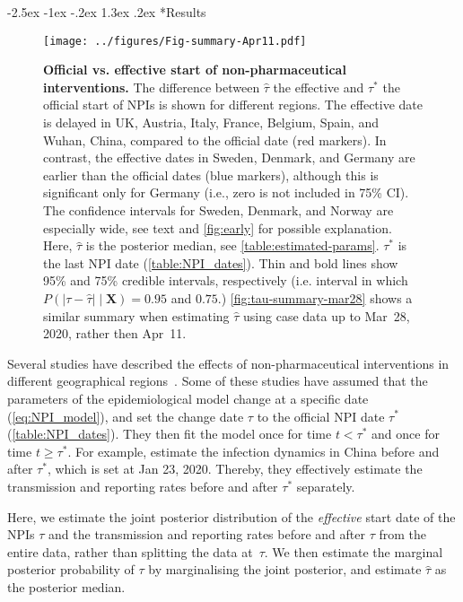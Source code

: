 \documentclass[12pt]{extarticle}
\makeatletter
\renewcommand\section{\@startsection {section}{1}{\z@}%
     {-2.5ex \@plus -1ex \@minus -.2ex}%
     {1.3ex \@plus.2ex}%
    {\Large\bfseries}}
\let\vec\mathbf
\makeatother
\begin{document}
\section*{Results}



\begin{figure}[b!]
    \centering
	\texttt{[image: ../figures/Fig-summary-Apr11.pdf]}	
    \caption{
    \textbf{Official vs. effective start of non-pharmaceutical interventions.}
    	The difference between $\hat{\tau}$ the effective and $\tau^*$ the official start of NPIs is shown for different regions. The effective date is delayed in UK, Austria, Italy, France, Belgium, Spain, and Wuhan, China, compared to the official date (red markers). In contrast, the effective dates in Sweden, Denmark, and Germany are earlier than the official dates (blue markers), although this is significant only for Germany (i.e., zero is not included in 75\% CI). The confidence intervals for Sweden, Denmark, and Norway are especially wide, see text and \autoref{fig:early} for possible explanation.
	Here, $\hat{\tau}$ is the posterior median, see \autoref{table:estimated-params}. $\tau^*$ is the last NPI date (\autoref{table:NPI_dates}). Thin and bold lines show 95\% and 75\% credible intervals, respectively (i.e. interval in which $P(|\tau - \hat{\tau}| \mid \vec{X}) = 0.95$ and $0.75$.) \autoref{fig:tau-summary-mar28} shows a similar summary when estimating $\hat{\tau}$ using case data up to Mar~28, 2020, rather then Apr~11.
    }
    \label{fig:tau-summary}
\end{figure}



Several studies have described the effects of non-pharmaceutical interventions in different geographical regions~\citep{Flaxman2020,Gatto2020,Li2020}. 
Some of these studies have assumed that the parameters of the epidemiological model change at a specific date (\autoref{eq:NPI_model}), and set the change date $\tau$ to the official NPI date $\tau^*$ (\autoref{table:NPI_dates}).
They then fit the model once for time $t<\tau^*$ and once for time $t \ge \tau^*$.
For example, \citet{Li2020} estimate the infection dynamics in China before and after $\tau^*$, which is set at Jan 23, 2020. Thereby, they effectively estimate the transmission and reporting rates before and after $\tau^*$ separately.

Here, we estimate the joint posterior distribution of the \emph{effective} start date of the NPIs $\tau$ and the transmission and reporting rates before and after $\tau$ from the entire data, rather than splitting the data at~$\tau$. 
We then estimate the marginal posterior probability of $\tau$ by marginalising the joint posterior, and estimate $\hat{\tau}$ as the posterior median.
\end{document}
